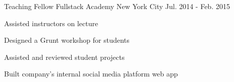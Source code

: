 \begin{cventries}
  \cventry
    {Teaching Fellow} %
    {Fullstack Academy} %
    {New York City} %
    {Jul. 2014 - Feb. 2015} %
    {
      \begin{cvitems} %
        \item {Assisted instructors on lecture}
        \item {Designed a Grunt workshop for students}
        \item {Assisted and reviewed student projects}
        \item {Built company's internal social media platform web app}
      \end{cvitems}
    }

\end{cventries}
